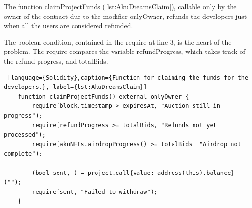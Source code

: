 The function claimProjectFunds (\autoref{lst:AkuDreamsClaim}), callable only by the owner of the contract due to the modifier onlyOwner, 
refunds the developers just when all the users are considered refunded. 

The boolean condition, contained in the require at line 3, is the heart of the problem. 
The require compares the variable refundProgress, which takes track of the refund progress, 
and totalBids.
\begin{lstlisting} [language={Solidity},caption={Function for claiming the funds for the developers.}, label={lst:AkuDreamsClaim}]
    function claimProjectFunds() external onlyOwner {
        require(block.timestamp > expiresAt, "Auction still in progress");
        require(refundProgress >= totalBids, "Refunds not yet processed");
        require(akuNFTs.airdropProgress() >= totalBids, "Airdrop not complete");

        (bool sent, ) = project.call{value: address(this).balance}("");
        require(sent, "Failed to withdraw");        
    }
\end{lstlisting}

